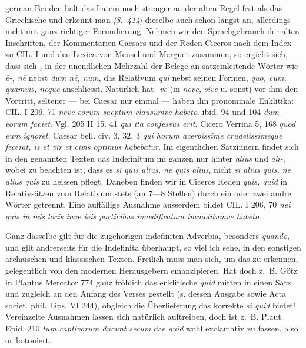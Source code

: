 \begin{otherlanguage*}{german}
Bei den  hält das Latein noch strenger an der alten Regel fest als das Griechische und erkennt man \hypertarget{p414}{\emph{[S.~414]}}\label{p414} dieselbe auch schon längst an, allerdings nicht mit ganz richtiger Formulierung. Nehmen wir den Sprachgebrauch der alten Inschriften, der Kommentarien Caesars und der Reden Ciceros nach dem Index zu CIL. I und den Lexica von Meusel und Merguet zusammen, so ergiebt sich, dass sich \emph{, } in der unendlichen Mehrzahl der Belege an satzeinleitende Wörter wie \emph{ē-, nē} nebst \emph{dum nē, num}, das Relativum \emph{qui} nebst seinen Formen, \emph{quo, cum, quamvis, neque} anschliesst. Natürlich hat \emph{-ve} (in \emph{neve, sive} u. sonst) vor ihm den Vortritt, seltener — bei Caesar nur einmal — haben ihn pronominale Enklitika: CIL. I 206, 71 \emph{neve eorum  saeptum clausumve habeto}. ibid. 94 und 104 \emph{dum eorum  faciet}. Vgl. 205 II 15. 41 \emph{qui ita  confessus erit}. Cicero Verrina 5, 168 \emph{quod eum  ignoret}. Caesar bell. civ. 3, 32, 3 \emph{qui horum  acerbissime crudelissimeque fecerat, is et vir et civis optimus habebatur}. Im eigentlichen Satzinnern findet sich in den genannten Texten das Indefinitum im ganzen nur hinter \emph{alius} und \emph{ali-}, wobei zu beachten ist, dass es \emph{si quis alius, ne quis alius}, nicht \emph{si alius quis, ne alius quis} zu heissen pflegt. Daneben finden wir in Ciceros Reden \emph{quis, quid} in Relativsätzen vom Relativum stets (an 7—8 Stellen) durch ein oder zwei andre Wörter getrennt. Eine auffällige Ausnahme ausserdem bildet CIL. I 206, 70 \emph{nei quis in ieis locis inve ieis porticibus  inaedificatum immolitumve habeto}.

Ganz dasselbe gilt für die zugehörigen indefiniten Adverbia, besonders \emph{quando}, und gilt andrerseits für die Indefinita überhaupt, so viel ich sehe, in den sonstigen archaischen und klassischen Texten. Freilich muss man sich, um das zu erkennen, gelegentlich von den modernen Herausgebern emanzipieren. Hat doch z.~B. Götz in Plautus Mercator 774 ganz fröhlich das enklitische \emph{quid} mitten in einen Satz und zugleich an den Anfang des Verses gestellt (s. dessen Ausgabe sowie Acta societ. phil. Lips. VI 244), obgleich die Überlieferung das korrekte \emph{si quid} bietet! Vereinzelte Ausnahmen lassen sich natürlich auftreiben, doch ist z.~B. Plaut. Epid. 210 \emph{tum captivorum  ducunt secum} das \emph{quid} wohl exclamativ zu fassen, also orthotoniert.


\end{otherlanguage*}

